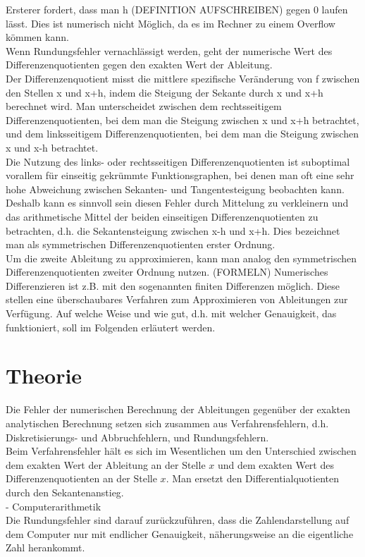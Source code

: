 \documentclass{scrartcl}
\begin{document}
Ersterer fordert, dass man h (DEFINITION AUFSCHREIBEN) gegen 0 laufen lässt. Dies ist numerisch nicht Möglich, da es im Rechner zu einem Overflow kömmen kann.\\
Wenn Rundungsfehler vernachlässigt werden, geht der numerische Wert des Differenzenquotienten gegen den exakten Wert der Ableitung. \\
Der Differenzenquotient misst die mittlere spezifische Veränderung von f zwischen den Stellen x und x+h, indem die Steigung der Sekante durch x und x+h berechnet wird. Man unterscheidet zwischen dem rechtsseitigem Differenzenquotienten, bei dem man die Steigung zwischen x und x+h betrachtet, und dem linksseitigem Differenzenquotienten, bei dem man die Steigung zwischen x und x-h betrachtet.\\
Die Nutzung des links- oder rechtsseitigen Differenzenquotienten ist suboptimal vorallem für einseitig gekrümmte Funktionsgraphen, bei denen man oft eine sehr hohe Abweichung zwischen Sekanten- und Tangentesteigung beobachten kann. Deshalb kann es sinnvoll sein diesen Fehler durch Mittelung zu verkleinern und das arithmetische Mittel der beiden einseitigen Differenzenquotienten zu betrachten, d.h. die Sekantensteigung zwischen x-h und x+h. Dies bezeichnet man als symmetrischen Differenzenquotienten erster Ordnung.\\
Um die zweite Ableitung zu approximieren, kann man analog den symmetrischen Differenzenquotienten zweiter Ordnung nutzen. (FORMELN)
\linebreak
Numerisches Differenzieren ist z.B. mit den sogenannten finiten Differenzen möglich. Diese stellen eine überschaubares Verfahren zum Approximieren von Ableitungen zur Verfügung. Auf welche Weise und wie gut, d.h. mit welcher Genauigkeit, das funktioniert, soll im Folgenden erläutert werden.  \\

\pagebreak \section{Theorie}
\label{sec:theorie}
Die Fehler der numerischen Berechnung der Ableitungen gegenüber der exakten analytischen Berechnung setzen sich zusammen aus Verfahrensfehlern, d.h. Diskretisierungs- und Abbruchfehlern, und Rundungsfehlern.\\
Beim Verfahrensfehler hält es sich im Wesentlichen um den Unterschied zwischen dem exakten Wert der Ableitung an der Stelle $x$ und dem exakten Wert des Differenzenquotienten an der Stelle $x$. Man ersetzt den Differentialquotienten durch den Sekantenanstieg.\\
- Computerarithmetik\\
Die Rundungsfehler sind darauf zurückzuführen, dass die Zahlendarstellung auf dem Computer nur mit endlicher Genauigkeit, näherungsweise an die eigentliche Zahl herankommt.
\end{document}
